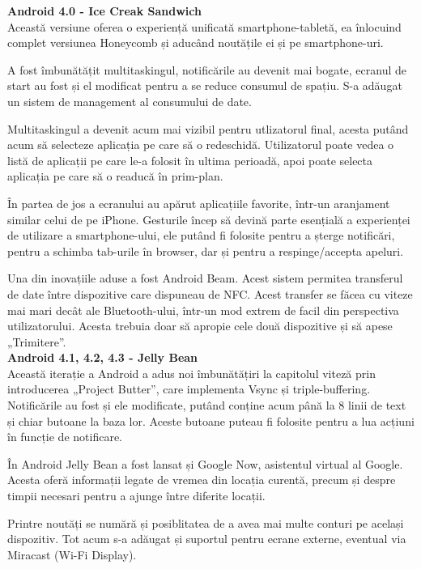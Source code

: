 \documentclass[12pt,a4paper]{article}
\begin{document}
\textbf{Android 4.0 - Ice Creak Sandwich}\\
Această versiune oferea o experiență unificată smartphone-tabletă, ea înlocuind complet versiunea Honeycomb și aducând noutățile ei și pe smartphone-uri.

	A fost îmbunătățit multitaskingul, notificările au devenit mai bogate, ecranul de start au fost și el modificat pentru a se reduce consumul de spațiu. S-a adăugat un sistem de management al consumului de date.

	Multitaskingul a devenit acum mai vizibil pentru utlizatorul final, acesta putând acum să selecteze aplicația pe care să o redeschidă. Utilizatorul poate vedea o listă de aplicații pe care le-a folosit în ultima perioadă, apoi poate selecta aplicația pe care să o readucă în prim-plan.

	În partea de jos a ecranului au apărut aplicațiile favorite, într-un aranjament similar celui de pe iPhone. Gesturile încep să devină parte esențială a experienței de utilizare a smartphone-ului, ele putând fi folosite pentru a șterge notificări, pentru a schimba tab-urile în browser, dar și pentru a respinge/accepta apeluri.

	Una din inovațiile aduse a fost Android Beam. Acest sistem permitea transferul de date între dispozitive care dispuneau de NFC. Acest transfer se făcea cu viteze mai mari decât ale Bluetooth-ului, într-un mod extrem de facil din perspectiva utilizatorului. Acesta trebuia doar să apropie cele două dispozitive și să apese „Trimitere”.\\

\textbf{Android 4.1, 4.2, 4.3 - Jelly Bean}\\
Această iterație a Android a adus noi îmbunătățiri la capitolul viteză prin introducerea „Project Butter”, care implementa Vsync și triple-buffering. Notificările au fost și ele modificate, putând conține acum până la 8 linii de text și chiar butoane la baza lor. Aceste butoane puteau fi folosite pentru a lua acțiuni în funcție de notificare.

	În Android Jelly Bean a fost lansat și Google Now, asistentul virtual al Google. Acesta oferă informații legate de vremea din locația curentă, precum și despre timpii necesari pentru a ajunge între diferite locații.

	Printre noutăți se numără și posiblitatea de a avea mai multe conturi pe același dispozitiv. Tot acum s-a adăugat și suportul pentru ecrane externe, eventual via Miracast (Wi-Fi Display).
\end{document}
